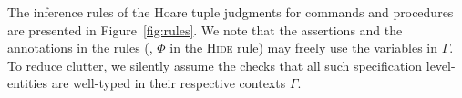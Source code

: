\begin{figure*}[t]
{}
\caption{\SCST inference rules.}\label{fig:rules}
\end{figure*}

The inference rules of the Hoare tuple judgments for commands and
procedures are presented in Figure~\ref{fig:rules}. We note that the
assertions and the annotations in the rules (\eg, $\Phi$ in the
\textsc{Hide} rule) may freely use the variables in $\Gamma$. To
reduce clutter, we silently assume the checks that all such
specification level-entities are well-typed in their respective
contexts $\Gamma$.

